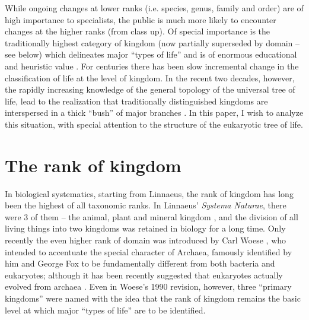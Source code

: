 \begin{artengenv}
While ongoing changes at lower ranks (i.e. species, genus, family and order) are of high importance to specialists, the
public is much more likely to encounter changes at the higher ranks (from class up). Of special importance is the
traditionally highest category of kingdom (now partially superseded by domain -- see below) which delineates major
``types of life'' and is of enormous educational and heuristic value
\parencite{copeland_kingdoms_1938,cavalier-smith_eukaryote_1981}.
For centuries there has been slow incremental change in the classification of life at the level
of kingdom. In the recent two decades, however, the rapidly increasing knowledge of the general topology of the
universal tree of life, lead to the realization that traditionally distinguished kingdoms are interspersed in a thick
``bush'' of major branches
\parencite[see e.g.][]{baldauf_kingdom-level_2000}.
In this paper, I wish to analyze
this situation, with special attention to the structure of the eukaryotic tree of life. 

\section{The rank of kingdom}

In biological systematics, starting from Linnaeus, the rank of kingdom has long been the highest of all taxonomic ranks.
In Linnaeus’ \textit{Systema Naturae}, there were 3 of them -- the animal, plant and mineral kingdom
\parencite{linnaeus_systema_1788},
and the division of all living things into two kingdoms was retained in
biology for a long time. Only recently the even higher rank of domain was introduced by Carl Woese
\parencite{woese_towards_1990},
who intended to accentuate the special character of
Archaea, famously identified by him and George Fox
\parencite{woese_phylogenetic_1977}
to be fundamentally
different from both bacteria and eukaryotes; although it has been recently suggested that eukaryotes actually evolved
from archaea
\parencite{williams_archaeal_2013}.
Even in Woese’s 1990 revision, however, three ``primary
kingdoms'' were named with the idea that the rank of kingdom remains the basic level at which major ``types of life'' are
to be identified.


\end{artengenv}
